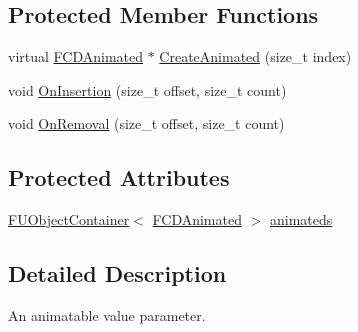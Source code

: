 \subsection*{Protected Member Functions}
\begin{DoxyCompactItemize}
\item 
virtual \hyperlink{classFCDAnimated}{FCDAnimated} $\ast$ \hyperlink{classFCDParameterListAnimatable_ae26241a1e4214a96f9c7735712d65ab0}{CreateAnimated} (size\_\-t index)
\item 
void \hyperlink{classFCDParameterListAnimatable_a0b9f3e66fa656882d0dd96990fecb5b2}{OnInsertion} (size\_\-t offset, size\_\-t count)
\item 
void \hyperlink{classFCDParameterListAnimatable_a4d691c5060728861b49b63b64ccff98c}{OnRemoval} (size\_\-t offset, size\_\-t count)
\end{DoxyCompactItemize}
\subsection*{Protected Attributes}
\begin{DoxyCompactItemize}
\item 
\hyperlink{classFUObjectContainer}{FUObjectContainer}$<$ \hyperlink{classFCDAnimated}{FCDAnimated} $>$ \hyperlink{classFCDParameterListAnimatable_a145430d7d71b81045b718a6ec935202a}{animateds}
\end{DoxyCompactItemize}


\subsection{Detailed Description}
An animatable value parameter. 

